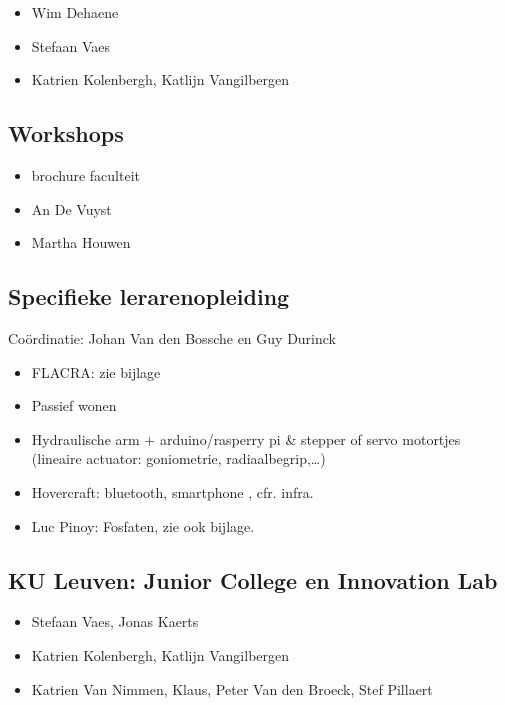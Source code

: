 \begin{itemize}	
	\item Wim Dehaene
	\item Stefaan Vaes
	\item Katrien Kolenbergh, Katlijn Vangilbergen	
\end{itemize}


\subsection{Workshops}

\begin{itemize}
	\item brochure faculteit
	\item An De Vuyst
	\item Martha Houwen
\end{itemize}
\subsection{Specifieke lerarenopleiding}
Coördinatie: Johan Van den Bossche en Guy Durinck
\begin{itemize}
	\item FLACRA: zie bijlage
	\item Passief wonen
	\item Hydraulische arm + arduino/rasperry pi \& stepper of servo motortjes (lineaire actuator: goniometrie, radiaalbegrip,\ldots )
	\item Hovercraft: bluetooth, smartphone , cfr. infra.
	\item Luc Pinoy: Fosfaten, zie ook bijlage. 
\end{itemize}
\subsection{KU Leuven: Junior College en Innovation Lab}


\begin{itemize}
	\item Stefaan Vaes, Jonas Kaerts
	\item Katrien Kolenbergh, Katlijn Vangilbergen
	\item Katrien Van Nimmen, Klaus, Peter Van den Broeck, Stef Pillaert
\end{itemize}

